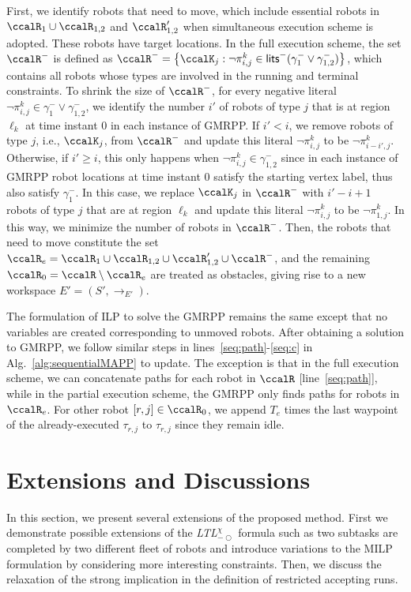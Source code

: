 \documentclass[Afour,sageh,times]{sagej}
\newcommand{\ltlx}{ {\it LTL}$_{-\bigcirc}^\chi$ }
\renewcommand{\ap}[3]{\mathcal{\pi}_{{#1},{#2}}^{#3}}
\begin{document}
{{ First, we identify robots that need to move, which include essential robots in $\ccalR_1 \cup \ccalR_{1,2}$ and $\ccalR_{1,2}'$ when simultaneous execution scheme is adopted. These robots have target locations. In the full execution scheme, the set $\ccalR^-$ is defined as $\ccalR^- = \left\{\ccalK_j: \neg \ap{i}{j}{k} \in \mathsf{lits}^- (\gamma_1^-  \vee \gamma_{1,2}^-) \right\}$, which contains all robots whose types are involved in the running and terminal constraints. To shrink the size of $\ccalR^-$, for every negative literal $\neg \ap{i}{j}{k} \in \gamma_1^- \vee \gamma_{1,2}^-$, we identify the number $i'$ of robots of type $j$ that is at region $\ell_k$ at time instant 0 in each instance of GMRPP. If $i' < i$, we remove robots of type $j$, i.e., $\ccalK_j$, from $\ccalR^-$ and update this literal $\neg \ap{i}{j}{k}$ to be $\neg \ap{i-i'}{j}{k}$. Otherwise, if $i' \geq i$, this only happens when $\neg \ap{i}{j}{k} \in \gamma_{1,2}^-$ since in each instance of GMRPP robot locations at time instant 0 satisfy the starting vertex label, thus also satisfy $\gamma_1^-$. In this case, we replace $\ccalK_j$ in $\ccalR^-$ with $i'-i+1$ robots of type $j$ that are at region $\ell_k$ and update this literal $\neg \ap{i}{j}{k}$ to be $\neg \ap{1}{j}{k}$. In this way, we  minimize the number of robots in $\ccalR^-$. Then, the robots that need to move constitute the set $\ccalR_e = \ccalR_1 \cup \ccalR_{1,2} \cup \ccalR_{1,2}' \cup \ccalR^-$, and the remaining $\ccalR_0 = \ccalR \setminus \ccalR_e$ are treated as obstacles, giving rise to a new workspace $E' = (S', \to_{E'})$.

The formulation of ILP to solve the GMRPP remains the same except that no variables are created corresponding to unmoved robots. After obtaining a solution to GMRPP, we follow similar steps in lines~\ref{seq:path}-\ref{seq:c} in Alg.~\ref{alg:sequentialMAPP} to update. The exception is that in the full execution scheme, we can concatenate paths for each robot in $\ccalR$ [line~\ref{seq:path}], while in the partial execution scheme, the GMRPP only finds paths for robots in $\ccalR_e$. For other robot $[r,j]\in \ccalR_0$, we append $T_e$ times the last waypoint of the already-executed $\tau_{r,j}$ to $\tau_{r,j}$ since they remain idle.


\section{Extensions and Discussions}\label{sec:extension}
In this section, we present several extensions of the proposed method. First we demonstrate possible extensions of the \ltlx formula such as two subtasks are completed by two different fleet of robots and  introduce variations to the MILP formulation by considering more interesting constraints. Then, we discuss the relaxation of the strong implication in the definition of restricted accepting runs.


}}
\end{document}
